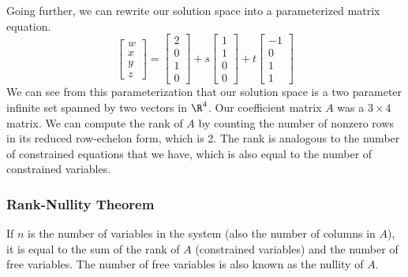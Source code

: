 \documentclass{math}
\begin{document}
Going further, we can rewrite our solution space into a parameterized matrix
equation.
\[ \begin{bmatrix}w \\ x \\ y \\ z\end{bmatrix} =
  \begin{bmatrix}2 \\ 0 \\ 1 \\ 0\end{bmatrix}+
  s\begin{bmatrix}1 \\ 1 \\ 0 \\ 0\end{bmatrix}+
  t\begin{bmatrix}-1 \\ 0 \\ 1 \\ 1\end{bmatrix} \]
We can see from this parameterization that our solution space is a two parameter
infinite set spanned by two vectors in \( \R^4 \). Our coefficient matrix
\( A \) was a \( 3\times4 \) matrix. We can compute the rank of \( A \) by
counting the number of nonzero rows in its reduced row-echelon form, which is
2. The rank is analogous to the number of constrained equations that we have,
which is also equal to the number of constrained variables. \par

\subsubsection*{Rank-Nullity Theorem}
If \( n \) is the number of variables in the system (also the number of columns
in \( A \)), it is equal to the sum of the rank of \( A \) (constrained
variables) and the number of free variables. The number of free variables is
also known as the nullity of \( A \).
\end{document}
